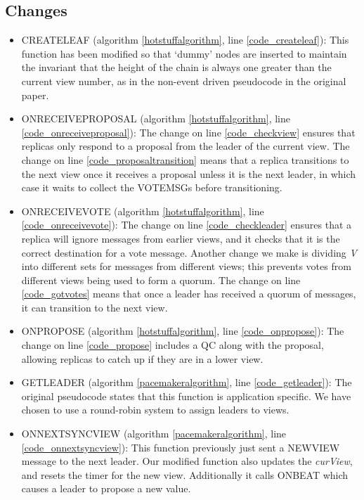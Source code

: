 \subsection{Changes}
\begin{itemize}
	\item CREATE{\large L}EAF (algorithm \ref{hotstuffalgorithm}, line \ref{code_createleaf}): This function has been modified so that `dummy' nodes are inserted to maintain the invariant that the height of the chain is always one greater than the current view number, as in the non-event driven pseudocode in the original paper.
	\item ON{\large R}ECEIVE{\large P}ROPOSAL (algorithm \ref{hotstuffalgorithm}, line \ref{code_onreceiveproposal}): The change on line \ref{code_checkview} ensures that replicas only respond to a proposal from the leader of the current view. The change on line \ref{code_proposaltransition} means that a replica transitions to the next view once it receives a proposal unless it is the next leader, in which case it waits to collect the VOTE{\large M}SGs before transitioning.
	\item ON{\large R}ECEIVE{\large V}OTE (algorithm \ref{hotstuffalgorithm}, line \ref{code_onreceivevote}): The change on line \ref{code_checkleader} ensures that a replica will ignore messages from earlier views, and it checks that it is the correct destination for a vote message. Another change we make is dividing \textit{V} into different sets for messages from different views; this prevents votes from different views being used to form a quorum. The change on line \ref{code_gotvotes} means that once a leader has received a quorum of messages, it can transition to the next view.
	\item ON{\large P}ROPOSE (algorithm \ref{hotstuffalgorithm}, line \ref{code_onpropose}): The change on line \ref{code_propose} includes a QC along with the proposal, allowing replicas to catch up if they are in a lower view.
	\item GET{\large L}EADER (algorithm \ref{pacemakeralgorithm}, line \ref{code_getleader}): The original pseudocode states that this function is application specific. We have chosen to use a round-robin system to assign leaders to views.
	\item ON{\large N}EXT{\large S}YNC{\large V}IEW (algorithm \ref{pacemakeralgorithm}, line \ref{code_onnextsyncview}): This function previously just sent a NEW{\large V}IEW message to the next leader. Our modified function also updates the \textit{curView}, and resets the timer for the new view. Additionally it calls ON{\large B}EAT which causes a leader to propose a new value.

\end{itemize}
